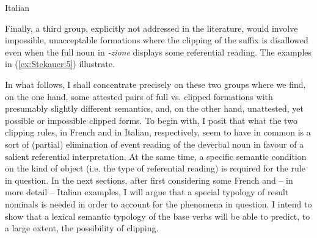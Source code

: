 \documentclass[output=paper]{langsci/langscibook}
\begin{document}
\begin{exe}
\ex\label{ex:Stekauer:4} Italian
\begin{xlist}
\end{xlist}
\end{exe}

Finally, a third group, explicitly not addressed in the literature,
would involve impossible, unacceptable formations where the
clipping of the suffix is disallowed even when the full noun in
\emph{-zione} displays some referential reading. The examples in (\ref{ex:Stekauer:5})
illustrate.


\begin{exe}
\ex\label{ex:Stekauer:5}
\begin{xlist}
\end{xlist}
\end{exe}

In what follows, I shall concentrate precisely on these two groups where
we find, on the one hand, some attested pairs of full vs. clipped
formations with presumably slightly different semantics, and, on the
other hand, unattested, yet possible or impossible clipped forms. To
begin with, I posit that what the two clipping rules, in French and in
Italian, respectively, seem to have in common is a sort of (partial)
elimination of event reading of the deverbal noun in favour of a salient
referential interpretation. At the same time, a specific semantic
condition on the kind of object (i.e. the type of referential reading)
is required for the rule in question. In the next sections, after first
considering some French and -- in more detail -- Italian examples, I
will argue that a special typology of result nominals %
\citep[elaborated by][]{Melloni2011} %
%
is needed in order to account for the phenomena in
question. I intend to show that a lexical semantic typology of the base
verbs will be able to predict, to a large extent, the possibility of
clipping.
\end{document}
